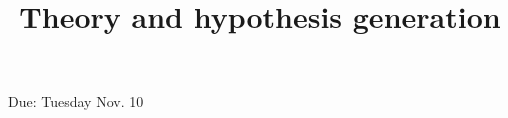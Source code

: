 \documentclass[a4, 12pt]{article}
\title{Theory and hypothesis generation}
\author{}
\date{}
\begin{document}
\maketitle

Due: Tuesday Nov. 10





\end{document}
